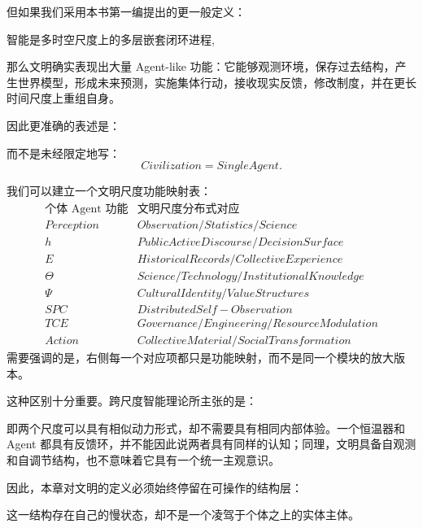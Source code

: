 但如果我们采用本书第一编提出的更一般定义：
\begin{statementbox}
智能是多时空尺度上的多层嵌套闭环进程,
\end{statementbox}
那么文明确实表现出大量 Agent-like 功能：它能够观测环境，保存过去结构，产生世界模型，形成未来预测，实施集体行动，接收现实反馈，修改制度，并在更长时间尺度上重组自身。

因此更准确的表述是：
\begin{statementbox}
\centering
{}
\end{statementbox}
而不是未经限定地写：
\[
Civilization=SingleAgent.
\]

我们可以建立一个文明尺度功能映射表：
\[
\begin{array}{c|c}
\text{个体 Agent 功能} & \text{文明尺度分布式对应}\\
\hline
Perception & Observation/Statistics/Science\\
h & Public Active Discourse/Decision Surface\\
E & Historical Records/Collective Experience\\
\Theta & Science/Technology/Institutional Knowledge\\
\Psi & Cultural Identity/Value Structures\\
SPC & Distributed Self-Observation\\
TCE & Governance/Engineering/Resource Modulation\\
Action & Collective Material/Social Transformation
\end{array}
\]
需要强调的是，右侧每一个对应项都只是功能映射，而不是同一个模块的放大版本。

这种区别十分重要。跨尺度智能理论所主张的是：
\begin{statementbox}
\centering
{}
\end{statementbox}
即两个尺度可以具有相似动力形式，却不需要具有相同内部体验。一个恒温器和 Agent 都具有反馈环，并不能因此说两者具有同样的认知；同理，文明具备自观测和自调节结构，也不意味着它具有一个统一主观意识。

因此，本章对文明的定义必须始终停留在可操作的结构层：
\begin{statementbox}
\centering
{}
\end{statementbox}
这一结构存在自己的慢状态，却不是一个凌驾于个体之上的实体主体。

